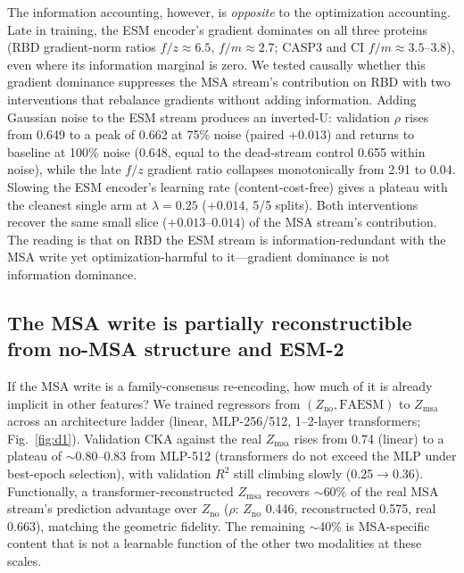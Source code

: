 \documentclass[11pt]{article}
\newcommand{\Zmsa}{\ensuremath{Z_{\mathrm{msa}}}}
\newcommand{\Zno}{\ensuremath{Z_{\mathrm{no}}}}
\begin{document}
The information accounting, however, is \emph{opposite} to the optimization
accounting. Late in training, the ESM encoder's gradient dominates on all
three proteins (RBD gradient-norm ratios $f/z\approx6.5$, $f/m\approx2.7$;
CASP3 and CI $f/m\approx3.5$--$3.8$), even where its information marginal is
zero. We tested causally whether this gradient dominance suppresses the MSA
stream's contribution on RBD with two interventions that rebalance gradients
without adding information. Adding Gaussian noise to the ESM stream produces
an inverted-U: validation $\rho$ rises from 0.649 to a peak of 0.662 at 75\%
noise (paired $+0.013$) and returns to baseline at 100\% noise (0.648, equal
to the dead-stream control 0.655 within noise), while the late $f/z$ gradient
ratio collapses monotonically from 2.91 to 0.04. Slowing the ESM encoder's
learning rate (content-cost-free) gives a plateau with the cleanest single arm
at $\lambda=0.25$ ($+0.014$, 5/5 splits). Both interventions recover the same
small slice ($+0.013$--$0.014$) of the MSA stream's contribution. The reading
is that on RBD the ESM stream is information-redundant with the MSA write yet
optimization-harmful to it---gradient dominance is not information dominance.

\subsection{The MSA write is partially reconstructible from no-MSA structure and ESM-2}
\label{sec:d1}

If the MSA write is a family-consensus re-encoding, how much of it is already
implicit in other features? We trained regressors from $(\Zno{}, \mathrm{FAESM})$
to \Zmsa{} across an architecture ladder (linear, MLP-256/512, 1--2-layer
transformers; Fig.~\ref{fig:d1}). Validation CKA against the real \Zmsa{}
rises from 0.74 (linear) to a plateau of $\sim$0.80--0.83 from MLP-512
(transformers do not exceed the MLP under best-epoch selection), with
validation $R^2$ still climbing slowly (0.25$\to$0.36). Functionally, a
transformer-reconstructed \Zmsa{} recovers $\sim$60\% of the real MSA stream's
prediction advantage over \Zno{} ($\rho$: \Zno{} 0.446, reconstructed 0.575,
real 0.663), matching the geometric fidelity. The remaining $\sim$40\% is
MSA-specific content that is not a learnable function of the other two
modalities at these scales.
\end{document}
